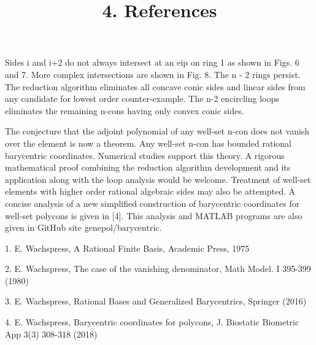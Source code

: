 \documentclass{article}
\begin{document}
Sides i and i+2 do not always intersect at an eip on ring 1 as shown in Figs. 6 and 7.  More complex intersections are shown in Fig. 8.  The n - 2 rings persist. The reduction algorithm eliminates all concave conic sides and linear sides from any candidate for lowest order counter-example.  The n-2 encircling loops eliminates the remaining n-cons having only convex conic sides. 
\par 
The conjecture that the adjoint polynomial of any well-set n-con does not vanish over the element is now a theorem.  Any well-set n-con has bounded rational barycentric coordinates.
Numerical studies support this theory.  A rigorous mathematical proof combining the reduction algorithm development and its application along with the loop analysis would be welcome.  Treatment of well-set elements with higher order rational algebraic sides may also be attempted.  A concise analysis of a new simplified construction of barycentric coordinates for well-set polycons is given in [4]. 
This analysis and MATLAB programs are also given in GitHub site genepol/barycentric.
\par
\title {4. References}
\par
1. E. Wachspress, A Rational Finite Basis, Academic Press, 1975

2. E. Wachspress, The case of the vanishing denominator, Math Model. I 395-399 (1980)

3. E. Wachspress, Rational Bases and Generalized Barycentrics, Springer (2016)

4. E. Wachspress, Barycentric coordinates for polycons, J. Biostatic Biometric App 3(3) 308-318 (2018)
\enddocument
\end{document}
